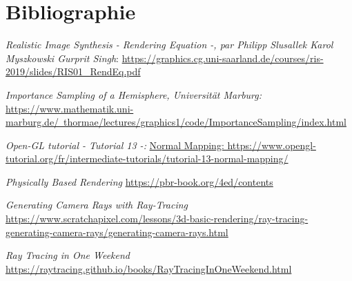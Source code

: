 \section{Bibliographie}

\textit{Realistic Image Synthesis - Rendering Equation -, par Philipp Slusallek Karol Myszkowski Gurprit Singh}: \href{https://graphics.cg.uni-saarland.de/courses/ris-2019/slides/RIS01_RendEq.pdf}{https://graphics.cg.uni-saarland.de/courses/ris-2019/slides/RIS01\_RendEq.pdf}

\textit{Importance Sampling of a Hemisphere, Universität Marburg:} \href{https://www.mathematik.uni-marburg.de/thormae/lectures/graphics1/code/ImportanceSampling/index.html}{https://www.mathematik.uni-marburg.de/~thormae/lectures/graphics1/code/ImportanceSampling/index.html}

\textit{Open-GL tutorial - Tutorial 13 -:} \href{Normal Mapping: https://www.opengl-tutorial.org/fr/intermediate-tutorials/tutorial-13-normal-mapping/}{Normal Mapping: https://www.opengl-tutorial.org/fr/intermediate-tutorials/tutorial-13-normal-mapping/}

\textit{Physically Based Rendering} \href{https://pbr-book.org/4ed/contents}{https://pbr-book.org/4ed/contents}

\textit{Generating Camera Rays with Ray-Tracing} \href{https://www.scratchapixel.com/lessons/3d-basic-rendering/ray-tracing-generating-camera-rays/generating-camera-rays.html}{https://www.scratchapixel.com/lessons/3d-basic-rendering/ray-tracing-generating-camera-rays/generating-camera-rays.html}

\textit{Ray Tracing in One Weekend} \href{https://raytracing.github.io/books/RayTracingInOneWeekend.html}{https://raytracing.github.io/books/RayTracingInOneWeekend.html}